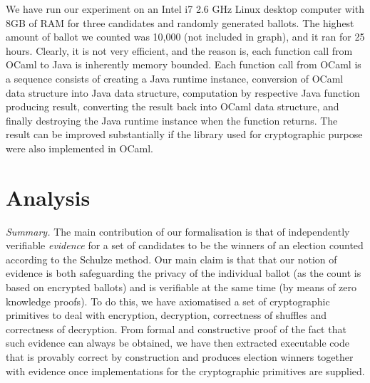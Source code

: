 \documentclass{llncs}
\begin{document}



We have run our experiment on an  Intel  i7  2.6  GHz  Linux  desktop  computer
with  8GB  of  RAM for three candidates and randomly generated ballots. The 
highest amount of ballot we counted was 10,000 (not included in graph), and 
it ran for 25 hours. Clearly, it is not very efficient, and the reason is, 
each function call from OCaml to Java is inherently memory bounded. Each 
function call from OCaml is a sequence consists of 
creating a Java runtime instance,
conversion of OCaml data structure into Java data structure, 
computation by respective Java function producing result,
converting the result back into OCaml data structure, and finally destroying 
the Java runtime instance when the function returns. The result can be
improved substantially if the library used for cryptographic purpose 
were also implemented in OCaml.

\section{Analysis}

\noindent\emph{Summary.} The main contribution of our formalisation is that of independently
verifiable \emph{evidence} for a set of candidates to be the winners
of an election counted according to the Schulze method. Our main
claim is that that our notion of evidence is both safeguarding the
privacy of the individual ballot (as the count is based on encrypted
ballots) and is verifiable at the same time (by means of zero
knowledge proofs). To do this, we have axiomatised a set of
cryptographic primitives to deal with encryption, decryption,
correctness of shuffles and correctness of decryption. From formal
and constructive proof of the fact that such evidence can always be
obtained, we have then extracted executable code that is provably
correct by construction and produces election winners together with
evidence once implementations for the cryptographic primitives are
supplied.
\end{document}
